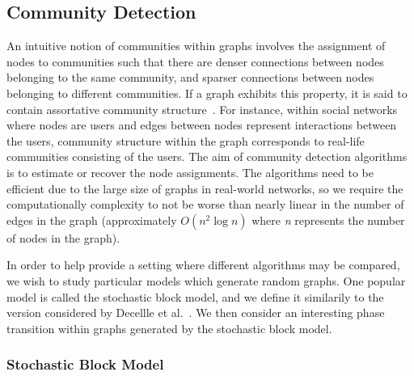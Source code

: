 \documentclass[12pt]{article}
\numberwithin{equation}{section}
\begin{document}
\subsection{Community Detection}
\label{sec:background;subsec:communityDetection}

An intuitive notion of communities within graphs involves the assignment of nodes to communities such that there are denser connections between nodes belonging to the same community, and sparser connections between nodes belonging to different communities. If a graph exhibits this property, it is said to contain assortative community structure~\cite{New06a,DKM+13,For10,New06b}. For instance, within social networks where nodes are users and edges between nodes represent interactions between the users, community structure within the graph corresponds to real-life communities consisting of the users. The aim of community detection algorithms is to estimate or recover the node assignments. The algorithms need to be efficient due to the large size of graphs in real-world networks, so we require the computationally complexity to not be worse than nearly linear in the number of edges in the graph (approximately $O(n^{2}\log n)$ where \textsl{n} represents the number of nodes in the graph).

In order to help provide a setting where different algorithms may be compared, we wish to study particular models which generate random graphs. One popular model is called the stochastic block model, and we define it similarily to the version considered by Decellle et al.~\cite{DKM+13}. We then consider an interesting phase transition within graphs generated by the stochastic block model.

\subsubsection{Stochastic Block Model}
\label{sec:background;subsec:communityDetection;subsubsec:stochasticBlockModel}
\end{document}
